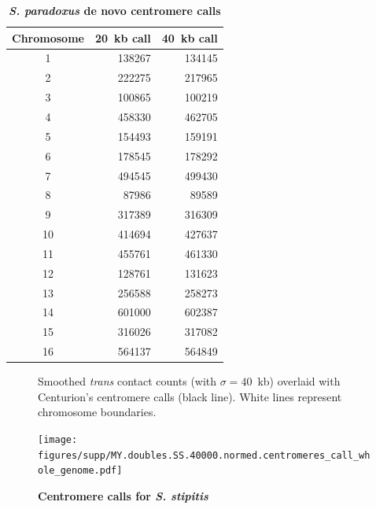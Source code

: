 \begin{table}[ht!]
\caption{\textbf{\textit{S. paradoxus} de novo centromere calls}}
\begin{center}
\begin{tabular}{c | r r}
\textbf{Chromosome} & \textbf{20~kb call} & \textbf{40~kb call} \\
\hline
1 & \num[group-separator={\,}]{138267} & \num[group-separator={\,}]{134145} \\
2 & \num[group-separator={\,}]{222275} & \num[group-separator={\,}]{217965} \\
3 & \num[group-separator={\,}]{100865} & \num[group-separator={\,}]{100219} \\
4 & \num[group-separator={\,}]{458330} & \num[group-separator={\,}]{462705} \\
5 & \num[group-separator={\,}]{154493} & \num[group-separator={\,}]{159191} \\
6 & \num[group-separator={\,}]{178545} & \num[group-separator={\,}]{178292} \\
7 & \num[group-separator={\,}]{494545} & \num[group-separator={\,}]{499430} \\
8 & \num[group-separator={\,}]{87986} & \num[group-separator={\,}]{89589} \\
9 & \num[group-separator={\,}]{317389} & \num[group-separator={\,}]{316309} \\
10 & \num[group-separator={\,}]{414694} & \num[group-separator={\,}]{427637} \\
11 & \num[group-separator={\,}]{455761} & \num[group-separator={\,}]{461330} \\
12 & \num[group-separator={\,}]{128761} & \num[group-separator={\,}]{131623} \\
13 & \num[group-separator={\,}]{256588} & \num[group-separator={\,}]{258273} \\
14 & \num[group-separator={\,}]{601000} & \num[group-separator={\,}]{602387} \\
15 & \num[group-separator={\,}]{316026} & \num[group-separator={\,}]{317082} \\
16 & \num[group-separator={\,}]{564137} & \num[group-separator={\,}]{564849} \\
\end{tabular}
\end{center}
\end{table}

\clearpage


\begin{figure}[ht!]
\caption{\textbf{Centromere calls for \textit{S. stipitis}}}{
Smoothed \textit{trans} contact counts (with $\sigma=40$~kb) overlaid with
Centurion's centromere calls (black line). White lines represent chromosome
boundaries.
}
\begin{center}
\texttt{[image: figures/supp/MY.doubles.SS.40000.normed.centromeres\_call\_whole\_genome.pdf]}
\end{center}
\label{suppfig:SS_calls}
\end{figure}


